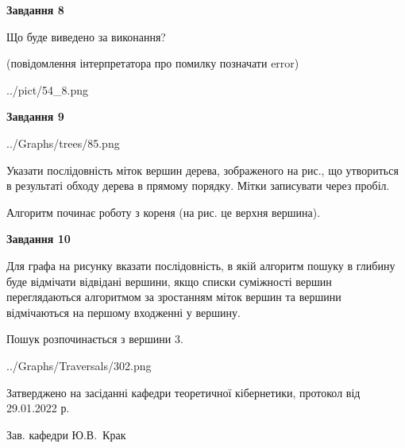 \documentclass[12pt, ukrainian]{article}
\begin{document}
{\begin {large}
{\begin {center}\textbf{Завдання 8}\end {center}}\par
Що буде виведено за виконання?\par
 (повідомлення інтерпретатора про помилку позначати error)\par
\begin{center}
	{../pict/54_8.png}
\end{center}
\newpage

{\begin {center}\textbf{Завдання 9}\end {center}}\par

\begin{center}
	{../Graphs/trees/85.png}
\end{center}
Указати послідовність міток вершин дерева, зображеного на рис., що утвориться в результаті обходу дерева в прямому порядку. Мітки записувати через пробіл.\par Алгоритм починає роботу з кореня (на рис. це верхня вершина).\par
\newpage

{\begin {center}\textbf{Завдання 10}\end {center}}\par
Для графа на рисунку вказати послідовність, в якій алгоритм пошуку в глибину буде відмічати відвідані вершини, якщо списки суміжності вершин переглядаються алгоритмом за зростанням міток вершин та вершини відмічаються на першому вход\-женні у вершину.\par
Пошук розпочинається з вершини 3.\par

\begin{center}
	{../Graphs/Traversals/302.png}
\end{center}\par
\newpage


\end {large}
}
{\smallskip \begin {small} Затверджено на засіданні кафедри теоретичної кібернетики, протокол  від   29.01.2022 р.\par\smallskip\smallskip
{\parbox {6.5 cm}{Зав. кафедри \dotfill Ю.В.~Крак}} \end{small}}
\end{document}
